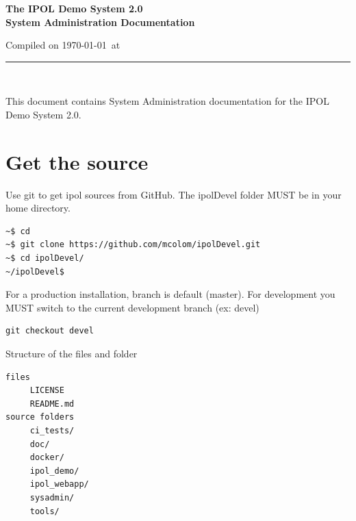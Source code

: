 \documentclass[a4paper,12pt]{article}
\begin{document}
\begin{titlepage}

\begin{center}
\vspace*{-1in}

\vspace*{0.6in}
\begin{Large}
\textbf{The IPOL Demo System 2.0 \\System Administration Documentation} \\
\end{Large}

\vspace*{0.6in}

\small{Compiled on \today\ at \currenttime}

\vspace*{0.6in}
\rule{80mm}{0.1mm}\\
\vspace*{0.1in}
\end{center}

\end{titlepage}

This document contains System Administration documentation for the IPOL Demo System 2.0.
\vspace*{0.6in}


\newpage

\tableofcontents
\newpage

\section{Get the source}
Use git to get ipol sources from GitHub. The ipolDevel folder MUST be in your home directory.
\begin{verbatim}
~$ cd
~$ git clone https://github.com/mcolom/ipolDevel.git
~$ cd ipolDevel/
~/ipolDevel$
\end{verbatim}

For a production installation, branch is default (master).
For development you MUST switch to the current development branch (ex: devel)
\begin{verbatim}
git checkout devel
\end{verbatim}

Structure of the files and folder
\begin{verbatim}
files
     LICENSE
     README.md
source folders
     ci_tests/
     doc/
     docker/
     ipol_demo/
     ipol_webapp/
     sysadmin/
     tools/
\end{verbatim}
\end{document}
